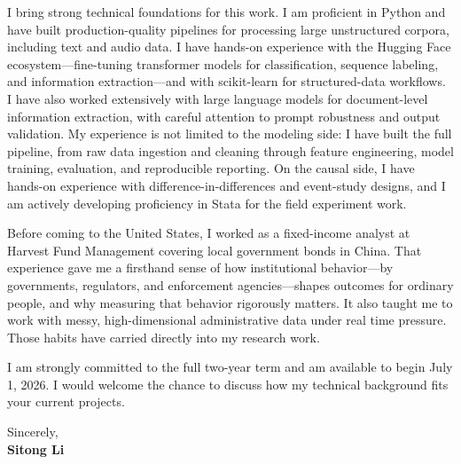 \documentclass[12pt]{article}
\begin{document}
I bring strong technical foundations for this work. I am proficient in Python and
have built production-quality pipelines for processing large unstructured corpora,
including text and audio data. I have hands-on experience with the Hugging Face
ecosystem---fine-tuning transformer models for classification, sequence labeling,
and information extraction---and with scikit-learn for structured-data workflows.
I have also worked extensively with large language models for document-level
information extraction, with careful attention to prompt robustness and output
validation. My experience is not limited to the modeling side: I have built the
full pipeline, from raw data ingestion and cleaning through feature engineering,
model training, evaluation, and reproducible reporting. On the causal side, I have
hands-on experience with difference-in-differences and event-study designs, and I
am actively developing proficiency in Stata for the field experiment work.

Before coming to the United States, I worked as a fixed-income analyst at Harvest
Fund Management covering local government bonds in China. That experience gave me a
firsthand sense of how institutional behavior---by governments, regulators, and
enforcement agencies---shapes outcomes for ordinary people, and why measuring that
behavior rigorously matters. It also taught me to work with messy, high-dimensional
administrative data under real time pressure. Those habits have carried directly into
my research work.

I am strongly committed to the full two-year term and am available to begin
July 1, 2026. I would welcome the chance to discuss how my technical background
fits your current projects.

\vspace{1em}

\noindent Sincerely,\\[0.5em]
\textbf{Sitong Li}
\end{document}

